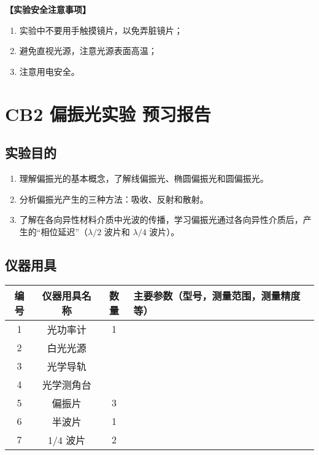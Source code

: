 \documentclass[dvipsnames, svgnames,a4paper,11pt]{article}
\begin{document}
	\textbf{【实验安全注意事项】}	
	\begin{enumerate}
		\item 实验中不要用手触摸镜片，以免弄脏镜片；
		\item 避免直视光源，注意光源表面高温；
		\item 注意用电安全。
		
	\end{enumerate}
	
	\clearpage
	\tableofcontents
	\clearpage
	
	
	
	
	\setcounter{section}{0}
	\section{CB2 偏振光实验 \quad\heiti 预习报告}
	
	\subsection{实验目的}
	\begin{enumerate}
		\item 理解偏振光的基本概念，了解线偏振光、椭圆偏振光和圆偏振光。
		\item 分析偏振光产生的三种方法：吸收、反射和散射。
		\item 了解在各向异性材料介质中光波的传播，学习偏振光通过各向异性介质后，产生的“相位延迟”（$\lambda/2$ 波片和 $\lambda/4$ 波片）。
	\end{enumerate}
	
	\subsection{仪器用具}
	\begin{table}[htbp]
		\centering
		\renewcommand\arraystretch{1.6}
		\begin{tabular}{c|c|c|p{}}
			\hline
			\textbf{编号} & \textbf{仪器用具名称} & \textbf{数量} & \textbf{主要参数（型号，测量范围，测量精度等）} \\
			\hline
			1 & 光功率计 & 1 & \\
			2 & 白光光源 &  & \\
			3 & 光学导轨 &  & \\
			4 & 光学测角台 &  & \\
			5 & 偏振片 & 3 & \\
			6 & 半波片 & 1 & \\
			7 & 1/4 波片 & 2 & \\
			\hline
		\end{tabular}
	\end{table}
	
\end{document}
